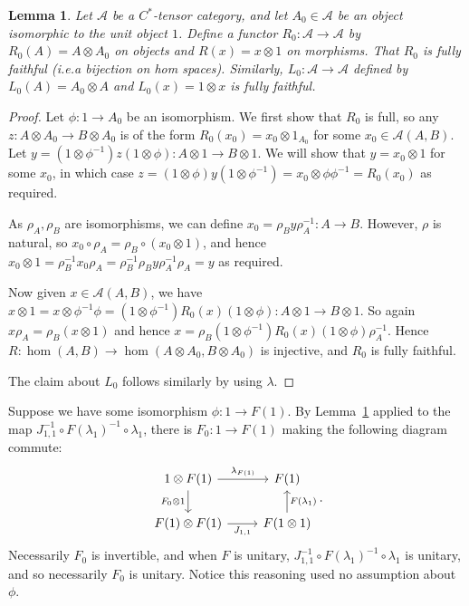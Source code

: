 \documentclass[a4paper,11pt]{article}
\theoremstyle{plain}
\newtheorem{lemma}[proposition]{Lemma}
\theoremstyle{remark}
\newcommand{\mc}[1]{\mathcal{#1}}
\begin{document}
\begin{lemma}\label{lem:form_of_map_involving_tensor_1}
Let $\mc A$ be a $C^*$-tensor category, and let $A_0\in\mc A$ be an object isomorphic to the unit object $1$.  Define a functor $R_0 \colon \mc A\to\mc A$ by $R_0(A)=A\otimes A_0$ on objects and $R(x)=x\otimes 1$ on morphisms.  That $R_0$ is fully faithful (i.e.\@ a bijection on hom spaces).  Similarly, $L_0 \colon \mc A\to\mc A$ defined by $L_0(A)=A_0\otimes A$ and $L_0(x) = 1\otimes x$ is fully faithful.
\end{lemma}
\begin{proof}
Let $\phi\colon 1 \to A_0$ be an isomorphism.  We first show that $R_0$ is full, so any $z\colon A\otimes A_0 \to B\otimes A_0$ is of the form $R_0(x_0) = x_0 \otimes 1_{A_0}$ for some $x_0\in\mc A(A,B)$.  Let $y = (1\otimes \phi^{-1}) z (1\otimes \phi) \colon A\otimes 1 \to B\otimes 1$.  We will show that $y = x_0 \otimes 1$ for some $x_0$, in which case $z = (1\otimes\phi) y (1\otimes \phi^{-1}) = x_0 \otimes \phi\phi^{-1} = R_0(x_0)$ as required.

As $\rho_A, \rho_B$ are isomorphisms, we can define $x_0 = \rho_B y \rho_A^{-1} \colon A \to B$.  However, $\rho$ is natural, so $x_0 \circ \rho_A = \rho_B \circ (x_0\otimes 1)$, and hence $x_0 \otimes 1 = \rho_B^{-1} x_0 \rho_A =  \rho_B^{-1} \rho_B y \rho_A^{-1} \rho_A = y$ as required.

Now given $x\in \mc A(A,B)$, we have $x\otimes 1 = x\otimes \phi^{-1}\phi = (1\otimes \phi^{-1}) R_0(x) (1\otimes \phi) \colon A\otimes 1 \to B\otimes 1$.  So again $x\rho_A = \rho_B(x\otimes 1)$ and hence $x = \rho_B (1\otimes \phi^{-1}) R_0(x) (1\otimes \phi) \rho_A^{-1}$.  Hence $R\colon \hom(A,B) \to \hom(A\otimes A_0, B\otimes A_0)$ is injective, and $R_0$ is fully faithful.

The claim about $L_0$ follows similarly by using $\lambda$.
\end{proof}

Suppose we have some isomorphism $\phi \colon 1 \to F(1)$.  By Lemma~\ref{lem:form_of_map_involving_tensor_1} applied to the map $J_{1,1}^{-1} \circ F(\lambda_1)^{-1} \circ \lambda_1$, there is $F_0 \colon 1 \to F(1)$ making the following diagram commute:
\begin{equation}
\begin{tikzcd}
  1 \otimes F(1) \ar[r, "\lambda_{F(1)}"] \ar[d, "F_0\otimes 1"'] & F(1) \\
  F(1) \otimes F(1) \ar[r, "J_{1,1}"'] & F(1\otimes 1) \ar[u, "F(\lambda_1)"']
\end{tikzcd}.   \label{eq:defn_F0}
\end{equation}
Necessarily $F_0$ is invertible, and when $F$ is unitary, $J_{1,1}^{-1} \circ F(\lambda_1)^{-1} \circ \lambda_1$ is unitary, and so necessarily $F_0$ is unitary.  Notice this reasoning used no assumption about $\phi$.
\end{document}
